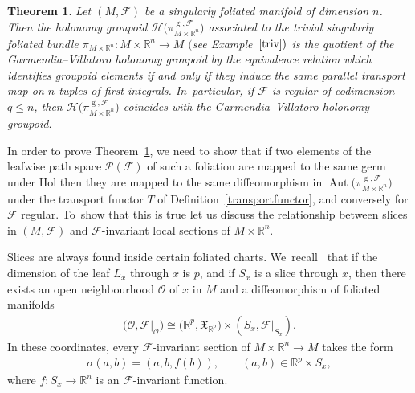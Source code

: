 \documentclass[pdftex]{sigma}
\numberwithin{equation}{section}
\newtheorem{Theorem}{Theorem}[section]
\def\g{\operatorname{g}}
\def\Aut{\operatorname{Aut}}
\def\FF{{\mathcal{F}}}
\def\HH{{\mathcal{H}}}
\def\PP{{\mathcal{P}}}
\def\OO{{\mathcal{O}}}
\def\RB{{\mathbb{R}}}
\def\XF{{\mathfrak{X}}}
\begin{document}
\begin{Theorem}\label{agree}
Let $(M,\FF)$ be a singularly foliated manifold of dimension $n$. Then the holonomy groupoid $\HH\big(\pi_{M\times\RB^{n}}^{\g,\FF}\big)$ associated to the trivial singularly foliated bundle \mbox{$\pi_{M\times\RB^{n}}\colon M\times\RB^{n}\rightarrow M$} $($see Example~$\ref{triv})$ is the quotient of the Garmendia--Villatoro holonomy groupoid by the equivalence relation which identifies groupoid elements if and only if they induce the same parallel transport map on $n$-tuples of first integrals. In~particular, if $\FF$ is regular of codimension $q\leq n$, then $\HH\big(\pi_{M\times\RB^{n}}^{\g,\FF}\big)$ coincides with the Garmendia--Villatoro holonomy groupoid.
\end{Theorem}

In order to prove Theorem~\ref{agree}, we need to show that if two elements of the leafwise path space $\PP(\FF)$ of such a foliation are mapped to the same germ under $\text{Hol}$ then they are mapped to the same diffeomorphism in $\Aut\big(\pi_{M\times\RB^{n}}^{\g,\FF}\big)$ under the transport functor $T$ of Definition~\ref{transportfunctor}, and conversely for $\FF$ regular. To~show that this is true let us discuss the relationship between slices in $(M,\FF)$ and $\FF$-invariant local sections of $M\times\RB^{n}$.

Slices are always found inside certain foliated charts. We~recall~\cite[Proposition~1.3]{iakovos4} that if the dimension of the leaf $L_{x}$ through $x$ is $p$, and if $S_{x}$ is a slice through $x$, then there exists an open neighbourhood $\OO$ of $x$ in $M$ and a diffeomorphism of foliated manifolds
\begin{gather}\label{chart}
\big(\OO,\FF|_{\OO}\big)\cong\big(\RB^{p},\XF_{\RB^{p}}\big)\times(S_{x},\FF|_{S_{x}}).
\end{gather}
In these coordinates, every $\FF$-invariant section of $M\times\RB^{n}\rightarrow M$ takes the form
\begin{gather}\label{sigmaf}
\sigma(a,b) = (a,b,f(b)),\qquad (a,b)\in\RB^{p}\times S_{x},
\end{gather}
where $f\colon S_{x}\rightarrow\RB^{n}$ is an $\FF$-invariant function.
\end{document}
